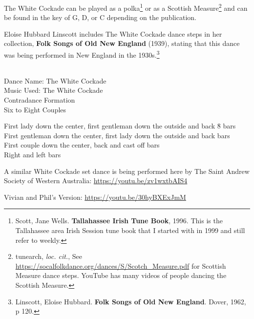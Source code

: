 \documentclass[11pt]{article}
\begin{document}
{\begin{minipage}{7.0in}
The White Cockade can be played as a polka\footnote{Scott, Jane Wells. \textbf{Tallahassee Irish Tune Book}, 1996. This is the Tallahassee area Irish Session tune book that I
started with in 1999 and still refer to weekly.} or as a Scottish Measure\footnote{tunearch, \textit{loc. cit.},  See \url{https://socalfolkdance.org/dances/S/Scotch\_Measure.pdf} for Scottish Measure dance steps. YouTube has many videos of people dancing the Scottish Measure.} and can be found in the key of G,
D, or C depending on the publication.

Eloise Hubbard Linscott includes The White Cockade dance steps in her collection, \textbf{Folk Songs of Old
New England} (1939), stating that this dance was being performed in New England in the 1930s.\footnote{Linscott, Eloise Hubbard. \textbf{Folk Songs of Old New England}. Dover, 1962, p 120.}

    {\parindent0pt
      \raggedright
      ~\\
Dance Name: The White Cockade \\
Music Used: The White Cockade \\
Contradance Formation \\
Six to Eight Couples \\
\begin{tabbing}
First lady down the center, first gentleman down the outside and back \qquad \= 8 bars \\
First gentleman down the center, first lady down the outside and back  bars \\
First couple down the center, back and cast off  bars \\
Right and left  bars 
\end{tabbing}
    }
    
A similar White Cockade set dance is being performed here by The Saint Andrew Society of Western
Australia: \url{https://youtu.be/zv1wxtbAIS4}

Vivian and Phil’s Version: \url{https://youtu.be/30hyBXExJmM}

  \end{minipage}
  \vspace*{\fill}
}
\end{document}
